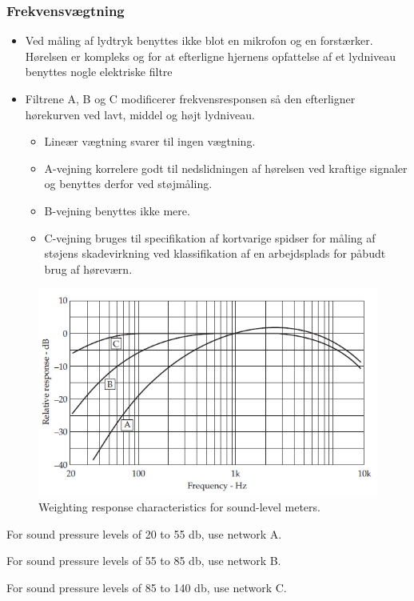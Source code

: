 \subsubsection{Frekvensvægtning}
\begin{itemize}
	\item Ved måling af lydtryk benyttes ikke blot en mikrofon og en forstærker. Hørelsen er kompleks og for at efterligne hjernens opfattelse af et lydniveau benyttes nogle elektriske filtre
	\item Filtrene A, B og C modificerer frekvensresponsen så den efterligner hørekurven ved lavt, middel og højt lydniveau.
	\begin{itemize}
		\item Lineær vægtning svarer til ingen vægtning.
		\item A-vejning korrelere godt til nedslidningen af hørelsen ved kraftige signaler og benyttes derfor ved støjmåling.
		\item B-vejning benyttes ikke mere.
		\item C-vejning bruges til specifikation af kortvarige spidser for måling af støjens skadevirkning ved klassifikation af en arbejdsplads for påbudt brug af høreværn.
	\end{itemize}
\end{itemize}

\begin{figure} [H]
	\centering
	\includegraphics[width=0.9\linewidth]{graphics/7.png}
	\caption{Weighting response characteristics for sound-level meters.}
	\label{fig:7}
\end{figure}

\begin{description}
	\item For sound pressure levels of 20 to 55 \si{\decibel}, use network A.
	\item For sound pressure levels of 55 to 85 \si{\decibel}, use network B.
	\item For sound pressure levels of 85 to 140 \si{\decibel}, use network C.
\end{description}


